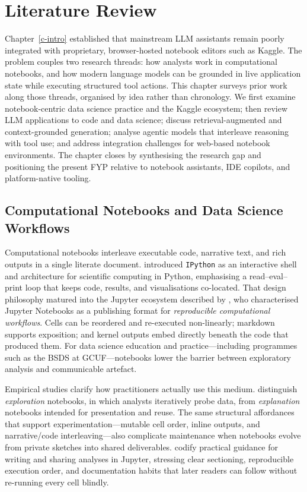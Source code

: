 \chapter{Literature Review}
\label{c-review}

Chapter~\ref{c-intro} established that mainstream \ac{LLM} assistants remain poorly integrated with proprietary, browser-hosted notebook editors such as Kaggle. The problem couples two research threads: how analysts work in computational notebooks, and how modern language models can be grounded in live application state while executing structured tool actions. This chapter surveys prior work along those threads, organised by idea rather than chronology. We first examine notebook-centric data science practice and the Kaggle ecosystem; then review \ac{LLM} applications to code and data science; discuss retrieval-augmented and context-grounded generation; analyse agentic models that interleave reasoning with tool use; and address integration challenges for web-based notebook environments. The chapter closes by synthesising the research gap and positioning the present FYP relative to notebook assistants, IDE copilots, and platform-native tooling.

\section{Computational Notebooks and Data Science Workflows}
\label{sec:lit-notebooks}

Computational notebooks interleave executable code, narrative text, and rich outputs in a single literate document. \textcite{perez2007ipython} introduced \texttt{IPython} as an interactive shell and architecture for scientific computing in Python, emphasising a read--eval--print loop that keeps code, results, and visualisations co-located. That design philosophy matured into the Jupyter ecosystem described by \textcite{kluyver2016jupyter}, who characterised Jupyter Notebooks as a publishing format for \emph{reproducible computational workflows}. Cells can be reordered and re-executed non-linearly; markdown supports exposition; and kernel outputs embed directly beneath the code that produced them. For data science education and practice---including programmes such as the \acf{BSDS} at \acf{GCUF}---notebooks lower the barrier between exploratory analysis and communicable artefact.

Empirical studies clarify how practitioners actually use this medium. \textcite{rule2018exploration} distinguish \emph{exploration} notebooks, in which analysts iteratively probe data, from \emph{explanation} notebooks intended for presentation and reuse. The same structural affordances that support experimentation---mutable cell order, inline outputs, and narrative/code interleaving---also complicate maintenance when notebooks evolve from private sketches into shared deliverables. \textcite{rule2019tenrules} codify practical guidance for writing and sharing analyses in Jupyter, stressing clear sectioning, reproducible execution order, and documentation habits that later readers can follow without re-running every cell blindly.

